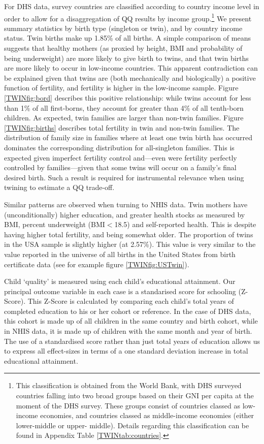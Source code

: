 For DHS data, survey countries are classified according to country income level 
in order to allow for a disaggregation of QQ results by income group.\footnote{
This classification is obtained from the World Bank, with DHS surveyed countries 
falling into two broad groups based on their GNI per capita at the moment of the 
DHS survey. These groups consist of countries classed as low-income economies, 
and countries classed as middle-income economies (either lower-middle or upper-%
middle). Details regarding this classification can be found in Appendix Table 
\ref{TWINtab:countries}.} We present summary statistics by birth type (singleton 
or twin), and by country income status. Twin births make up 1.85\% of all births.
A simple comparison of means suggests that healthy mothers (as proxied by height, 
BMI and probability of being underweight) are more likely to give birth to twins, 
and that twin births are more likely to occur in low-income countries. This 
apparent contradiction can be explained given that twins are (both mechanically 
and biologically) a positive function of fertility, and fertility is higher in 
the low-income sample. Figure \ref{TWINfig:bord} describes this positive 
relationship: while twins account for less than 1\% of all first-borns, they 
account for greater than 4\% of all tenth-born children. As expected, twin 
families are larger than non-twin families. Figure \ref{TWINfig:births} 
describes total fertility in twin and non-twin families. The distribution of 
family size in families where at least one twin birth has occurred dominates the 
corresponding distribution for all-singleton families.  This is expected given 
imperfect fertility control and---even were fertility perfectly controlled by 
families---given that some twins will occur on a family's final desired birth. 
Such a result is required for instrumental relevance when using twining to 
estimate a QQ trade-off.

Similar patterns are observed when turning to NHIS data.  Twin mothers have
(unconditionally) higher education, and greater health stocks as measured by
BMI, percent underweight (BMI$<$18.5) and self-reported health.  This is 
despite having higher total fertility, and being somewhat older.  The 
proportion of twins in the USA sample is slightly higher (at 2.57\%). This
value is very similar to the value reported in the universe of all births in
the United States from birth certificate data (see for example figure 
\ref{TWINfig:USTwin}).

Child `quality' is measured using each child's educational attainment. Our 
principal outcome variable in each case is a standarised score for schooling 
(Z-Score). This Z-Score is calculated by comparing each child's total years of 
completed education to his or her cohort or reference.  In the case of DHS data,
this cohort is made up of all children in the same country and birth cohort, 
while in NHIS data, it is made up of children with the same month and year of 
birth. The use of a standardised score rather than just total years of education
allows us to express all effect-sizes in terms of a one standard deviation 
increase in total educational attainment.

